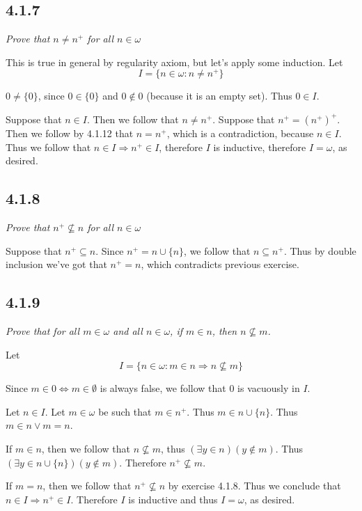 \documentclass[11pt,oneside,titlepage]{book}
\DeclareMathOperator \lra {\Leftrightarrow}
\DeclareMathOperator \ra {\Rightarrow}
\begin{document}
\subsection*{4.1.7}

\textit{Prove that $n \neq n^+$ for all $n \in \omega$}

This is true in general by regularity axiom, but let's apply some induction.
Let
$$I =  \{n \in \omega: n \neq n^+\}$$

$0 \neq \{0\}$, since $0 \in  \{0\}$ and $0 \notin 0$ (because it is an empty set). Thus $0 \in I$.

Suppose that $n \in I$. Then we follow that $n \neq n^+$.
Suppose that $n^+ = (n^+)^+$. Then we follow by 4.1.12 that $n = n^+$, which is a contradiction,
because $n \in I$. Thus we follow that $n \in I \ra n^+ \in I$, therefore $I$ is inductive,
therefore $I = \omega$, as desired.


\subsection*{4.1.8}

\textit{Prove that $n^+ \not \subseteq n$ for all $n \in \omega$}

Suppose that $n^+ \subseteq n$. Since $n^+ = n \cup \{n\}$, we follow that $n \subseteq n^+$.
Thus by double inclusion we've got that $n^+ = n$, which contradicts previous exercise.


\subsection*{4.1.9}

\textit{Prove that for all $m \in \omega$ and all $n \in \omega$, if $m \in n$, then
  $n \not \subseteq m$.}

Let
$$I = \{n \in \omega: m \in n \ra n \not \subseteq m\}$$

Since $m \in 0 \lra m \in \emptyset$ is always false, we follow that $0$ is vacuously in $I$.

Let $n \in I$. Let $m \in \omega$ be such that $m \in n^+$.
Thus $m \in n \cup \{n\}$. Thus $m \in n \lor m = n$.

If $m \in n$, then we follow that $n \not \subseteq m$, thus $(\exists y \in n)(y \notin m)$.
Thus $(\exists y \in n \cup \{n\})(y \notin m)$. Therefore $n^+ \not \subseteq m$.

If $m = n$, then we follow that $n^+ \not \subseteq n$ by exercise 4.1.8.
Thus we conclude that $n \in I \ra n^+ \in I$. Therefore $I$ is inductive and thus $I = \omega$,
as desired.
\end{document}
